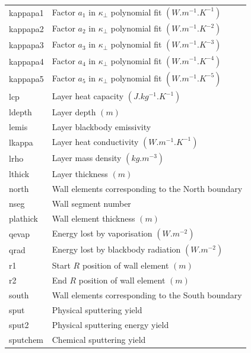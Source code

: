 \documentclass[a4paper,10pt]{report}
\begin{document}
\begin{center}
\begin{longtable}{|l|l|}
    kappapa1 \index{b2plot, kappapa1}  & Factor $a_1$ in $\kappa_\perp$ polynomial fit $(W.m^{-1}.K^{-1})$ \\
    kappapa2 \index{b2plot, kappapa2}  & Factor $a_2$ in $\kappa_\perp$ polynomial fit $(W.m^{-1}.K^{-2})$ \\
    kappapa3 \index{b2plot, kappapa3}  & Factor $a_3$ in $\kappa_\perp$ polynomial fit $(W.m^{-1}.K^{-3})$ \\
    kappapa4 \index{b2plot, kappapa4}  & Factor $a_4$ in $\kappa_\perp$ polynomial fit $(W.m^{-1}.K^{-4})$ \\
    kappapa5 \index{b2plot, kappapa5}  & Factor $a_5$ in $\kappa_\perp$ polynomial fit $(W.m^{-1}.K^{-5})$ \\
    lcp \index{b2plot, lcp}  & Layer heat capacity $(J.kg^{-1}.K^{-1})$ \\
    ldepth \index{b2plot, ldepth}   & Layer depth $(m)$ \\
    lemis \index{b2plot, lemis}     & Layer blackbody emissivity \\
    lkappa \index{b2plot, lkappa}   & Layer heat conductivity $(W.m^{-1}.K^{-1})$ \\
    lrho \index{b2plot, lrho}       & Layer mass density $(kg.m^{-3})$ \\
    lthick \index{b2plot, lthick}   & Layer thickness $(m)$ \\
    north \index{b2plot, north}     & Wall elements corresponding to the North boundary \\
    nseg \index{b2plot, nseg}      & Wall segment number \\
    plathick \index{b2plot, plathick}  & Wall element thickness $(m)$ \\
    qevap \index{b2plot, qevap}     & Energy lost by vaporisation $(W.m^{-2})$ \\
    qrad \index{b2plot, qrad}      & Energy lost by blackbody radiation $(W.m^{-2})$ \\
    r1 \index{b2plot, r1}        & Start $R$ position of wall element $(m)$ \\
    r2 \index{b2plot, r2}        & End $R$ position of wall element $(m)$ \\
    south \index{b2plot, south}     & Wall elements corresponding to the South boundary \\
    sput \index{b2plot, sput}      & Physical sputtering yield \\
    sput2 \index{b2plot, sput2}     & Physical sputtering energy yield \\
    sputchem \index{b2plot, sputchem}  & Chemical sputtering yield \\

\end{longtable}
\end{center}
\end{document}
